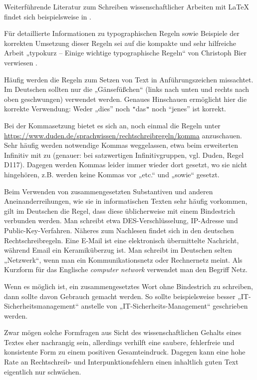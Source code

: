 \documentclass[
    fontsize=12pt,
    headings=small,
    parskip=half,           %
    bibliography=totoc,
    numbers=noenddot,       %
    open=any,               %
    ]{scrreprt}
\begin{document}
Weiterführende Literatur zum Schreiben wissenschaftlicher Arbeiten mit LaTeX findet sich beispielsweise in \cite{Schl2013}.

Für detaillierte Informationen zu typographischen Regeln sowie Beispiele der korrekten Umsetzung dieser Regeln sei auf die kompakte und sehr hilfreiche Arbeit „typokurz -- Einige wichtige typographische Regeln“ von Christoph Bier verwiesen \cite{Bier2009}.

Häufig werden die Regeln zum Setzen von Text in Anführungszeichen missachtet. Im Deutschen sollten nur die „Gänsefüßchen“ (links nach unten und rechts nach oben geschwungen) verwendet werden. Genaues Hinschauen ermöglicht hier die korrekte Verwendung: Weder „dies” noch {\verb#"#}das{\verb#"#} noch “jenes” ist korrekt.

Bei der Kommasetzung bietet es sich an, noch einmal die Regeln unter \url{https://www.duden.de/sprachwissen/rechtschreibregeln/komma} anzuschauen. Sehr häufig werden notwendige Kommas weggelassen, etwa beim erweiterten Infinitiv mit zu (genauer: bei satzwertigen Infinitivgruppen, vgl. Duden, Regel D117). Dagegen werden Kommas leider immer wieder dort gesetzt, wo sie nicht hingehören, z.B. werden keine Kommas vor „etc.“ und „sowie“ gesetzt.

Beim Verwenden von zusammengesetzten Substantiven und anderen Aneinanderreihungen, wie sie in informatischen Texten sehr häufig vorkommen, gilt im Deutschen die Regel, dass diese üblicherweise mit einem Bindestrich verbunden werden. Man schreibt etwa DES-Verschlüsselung, IP-Adresse und Public-Key-Verfahren. Näheres zum Nachlesen findet sich in den deutschen Rechtschreibregeln. Eine E-Mail ist eine elektronisch übermittelte Nachricht, während Email ein Keramiküberzug ist. Man schreibt im Deutschen selten „Netzwerk“, wenn man ein Kommunikationsnetz oder Rechnernetz meint. Als Kurzform für das Englische \emph{computer network} verwendet man den Begriff Netz.

Wenn es möglich ist, ein zusammengesetztes Wort ohne Bindestrich zu schreiben, dann sollte davon Gebrauch gemacht werden. So sollte beispielsweise besser „IT-Sicherheitsmanagement“ anstelle von „IT-Sicherheits-Management“ geschrieben werden.

Zwar mögen solche Formfragen aus Sicht des wissenschaftlichen Gehalts eines Textes eher nachrangig sein, allerdings verhilft eine saubere, fehlerfreie und konsistente Form zu einem positiven Gesamteindruck. Dagegen kann eine hohe Rate an Rechtschreib- und Interpunktionsfehlern einen inhaltlich guten Text eigentlich nur schwächen. 
\end{document}
